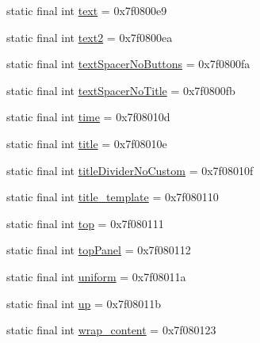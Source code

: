 \begin{DoxyCompactItemize}
\item 
static final int \mbox{\hyperlink{classandroid_1_1support_1_1v7_1_1appcompat_1_1_r_1_1id_a2930aafc4caa3944336307aaf845eefa}{text}} = 0x7f0800e9
\item 
static final int \mbox{\hyperlink{classandroid_1_1support_1_1v7_1_1appcompat_1_1_r_1_1id_ab9390bfca9faaba1e8692b82040e152d}{text2}} = 0x7f0800ea
\item 
static final int \mbox{\hyperlink{classandroid_1_1support_1_1v7_1_1appcompat_1_1_r_1_1id_a8ea861bc6460b6ef63f07beabc5cb74e}{text\+Spacer\+No\+Buttons}} = 0x7f0800fa
\item 
static final int \mbox{\hyperlink{classandroid_1_1support_1_1v7_1_1appcompat_1_1_r_1_1id_a65a1b7cb9dae5e4f54980d2dd6dc3e38}{text\+Spacer\+No\+Title}} = 0x7f0800fb
\item 
static final int \mbox{\hyperlink{classandroid_1_1support_1_1v7_1_1appcompat_1_1_r_1_1id_ae0962952dcceb61085f705f21bb7929c}{time}} = 0x7f08010d
\item 
static final int \mbox{\hyperlink{classandroid_1_1support_1_1v7_1_1appcompat_1_1_r_1_1id_a6c5ab3c0af64adc83824ccd5a9619c44}{title}} = 0x7f08010e
\item 
static final int \mbox{\hyperlink{classandroid_1_1support_1_1v7_1_1appcompat_1_1_r_1_1id_a9f52841478efd3906465f2ff95e2a5f0}{title\+Divider\+No\+Custom}} = 0x7f08010f
\item 
static final int \mbox{\hyperlink{classandroid_1_1support_1_1v7_1_1appcompat_1_1_r_1_1id_ad1a2ef4de6c56ea12952f3dcb5583365}{title\+\_\+template}} = 0x7f080110
\item 
static final int \mbox{\hyperlink{classandroid_1_1support_1_1v7_1_1appcompat_1_1_r_1_1id_a58b826a2af9f77fc1bd9661682d629a3}{top}} = 0x7f080111
\item 
static final int \mbox{\hyperlink{classandroid_1_1support_1_1v7_1_1appcompat_1_1_r_1_1id_a74344a9a6654c3e1e9647b9e800f3535}{top\+Panel}} = 0x7f080112
\item 
static final int \mbox{\hyperlink{classandroid_1_1support_1_1v7_1_1appcompat_1_1_r_1_1id_a18c3191610b9d0a8da3eadc047cc9a6d}{uniform}} = 0x7f08011a
\item 
static final int \mbox{\hyperlink{classandroid_1_1support_1_1v7_1_1appcompat_1_1_r_1_1id_a9aab36bc7e4cb601c12167a3b78ed738}{up}} = 0x7f08011b
\item 
static final int \mbox{\hyperlink{classandroid_1_1support_1_1v7_1_1appcompat_1_1_r_1_1id_a5263ea8cbb699c84a7171895a696e0c1}{wrap\+\_\+content}} = 0x7f080123
\end{DoxyCompactItemize}
